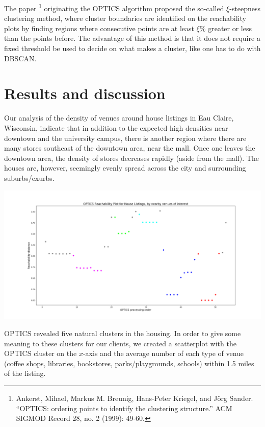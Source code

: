 \documentclass{article}
\begin{document}
The paper \footnote{Ankerst, Mihael, Markus M. Breunig, Hans-Peter Kriegel, and Jörg Sander. “OPTICS: ordering points to identify the clustering structure.” ACM SIGMOD Record 28, no. 2 (1999): 49-60.} originating the OPTICS algorithm proposed the so-called $\xi$-steepness clustering method, where cluster boundaries are identified on the reachability plots by finding regions where consecutive points are at least $\xi$\% greater or less than the points before. The advantage of this method is that it does not require a fixed threshold be used to decide on what makes a cluster, like one has to do with DBSCAN. 

\section{Results and discussion}

Our analysis of the density of venues around house listings in Eau Claire, Wisconsin, indicate that in addition to the expected high densities near downtown and the university campus, there is another region where there are many stores southeast of the downtown area, near the mall. Once one leaves the downtown area, the density of stores decreases rapidly (aside from the mall). The houses are, however, seemingly evenly spread across the city and surrounding suburbs/exurbs. 

\hspace{-2.5cm}\includegraphics[scale=0.43]{OPTICS_reachability_2.png}

OPTICS revealed five natural clusters in the housing. In order to give some meaning to these clusters for our clients, we created a scatterplot with the OPTICS cluster on the $x$-axis and the average number of each type of venue (coffee shops, libraries, bookstores, parks/playgrounds, schools) within 1.5 miles of the listing. 
\end{document}
